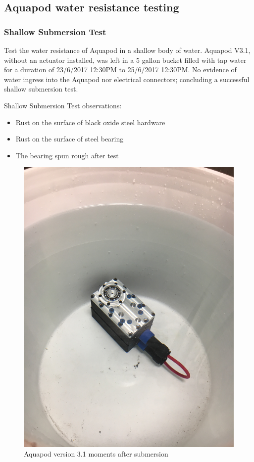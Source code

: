 
\subsection{Aquapod water resistance testing}


\subsubsection{Shallow Submersion Test}
Test the water resistance of Aquapod in a shallow body of water.
Aquapod V3.1, without an actuator installed, was left in a 5 gallon bucket filled with tap water for a duration of 23/6/2017 12:30PM to 25/6/2017 12:30PM. 
No evidence of water ingress into the Aquapod nor electrical connectors; concluding a successful shallow submersion test.

Shallow Submersion Test observations:
\begin{itemize}
    \item Rust on the surface of black oxide steel hardware
    
    \item Rust on the surface of steel bearing

    \item The bearing spun rough after test

\end{itemize}

\begin{figure}[h]
\centering
\includegraphics[width=1.0\columnwidth]{./img/aquaPod-test-one-start.JPG}
\caption{Aquapod version 3.1 moments after submersion}
\label{fig:pod in bucket}
\end{figure}



